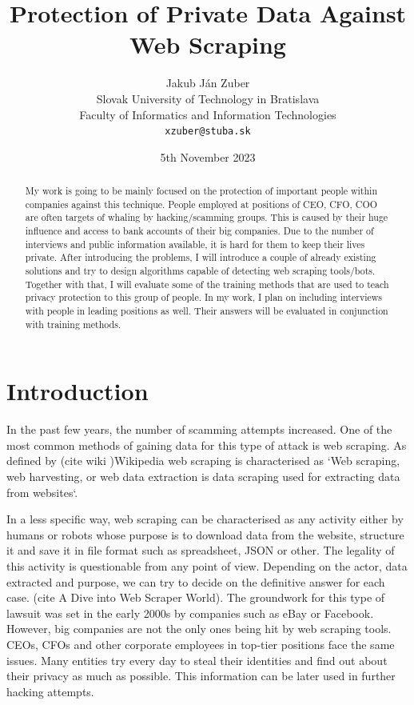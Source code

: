 \documentclass[10pt,twoside]{article}
\title{Protection of Private Data Against Web Scraping}
\author{Jakub Ján Zuber\\[2pt]
  {\small Slovak University of Technology in Bratislava}\\
  {\small Faculty of Informatics and Information Technologies}\\
  {\small \texttt{xzuber@stuba.sk}}
}
\date{\small 5th November 2023}
\begin{document}
\maketitle
\newpage

\begin{abstract}
My work is going to be mainly focused on the protection of important people within companies against this technique. People employed at positions of CEO, CFO, COO are often targets of whaling by hacking/scamming groups. This is caused by their huge influence and access to bank accounts of their big companies. Due to the number of interviews and public information available, it is hard for them to keep their lives private. After introducing the problems, I will introduce a couple of already existing solutions and try to design algorithms capable of detecting web scraping tools/bots. Together with that, I will evaluate some of the training methods that are used to teach privacy protection to this group of people. In my work, I plan on including interviews with people in leading positions as well. Their answers will be evaluated in conjunction with training methods.
\end{abstract}
\newpage

\section{Introduction}
In the past few years, the number of scamming attempts increased.  One of the most common methods of gaining data for this type of attack is web scraping. As defined by (cite wiki )Wikipedia web scraping is characterised as `Web scraping, web harvesting, or web data extraction is data scraping used for extracting data from websites`.

In a less specific way, web scraping can be characterised as any activity either by humans or robots whose purpose is to download data from the website, structure it and save it in file format such as spreadsheet, JSON or other. The legality of this activity is questionable from any point of view. Depending on the actor, data extracted and purpose, we can try to decide on the definitive answer for each case. (cite A Dive into Web Scraper World). The groundwork for this type of lawsuit was set in the early 2000s by companies such as eBay or Facebook. However, big companies are not the only ones being hit by web scraping tools. CEOs, CFOs and other corporate employees in top-tier positions face the same issues. Many entities try every day to steal their identities and find out about their privacy as much as possible. This information can be later used in further hacking attempts. 
\end{document}
